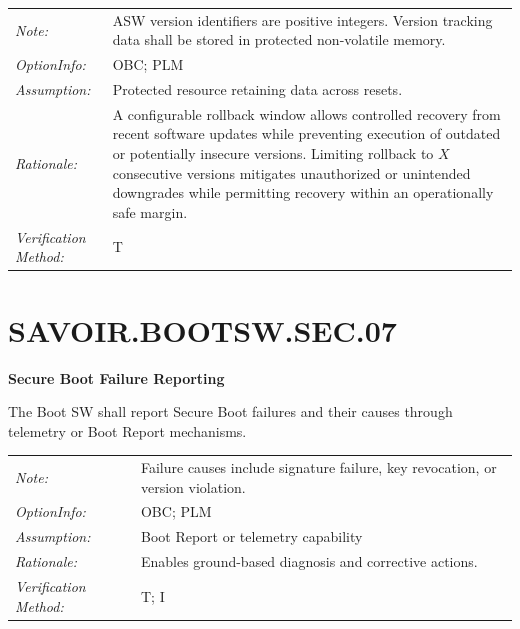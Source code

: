 \begin{tabularx}{\textwidth}{@{}lX@{}}
\textit{Note:} & ASW version identifiers are positive integers. Version tracking data shall be stored in protected non-volatile memory. \\[6pt]
\textit{OptionInfo:} & OBC; PLM \\[6pt]
\textit{Assumption:} & Protected resource retaining data across resets. \\[6pt]
\textit{Rationale:} & A configurable rollback window allows controlled recovery from recent software updates while preventing execution of outdated or potentially insecure versions. Limiting rollback to $X$ consecutive versions mitigates unauthorized or unintended downgrades while permitting recovery within an operationally safe margin. \\[6pt]
\textit{Verification Method:} & T \\[6pt]
\end{tabularx}

\headrule

\section*{SAVOIR.BOOTSW.SEC.07}

\textbf{Secure Boot Failure Reporting}

The Boot SW shall report Secure Boot failures and their causes through telemetry or Boot Report mechanisms.

\vspace{6pt}

\begin{tabularx}{\textwidth}{@{}lX@{}}
\textit{Note:} & Failure causes include signature failure, key revocation, or version violation. \\[6pt]
\textit{OptionInfo:} & OBC; PLM \\[6pt]
\textit{Assumption:} & Boot Report or telemetry capability \\[6pt]
\textit{Rationale:} & Enables ground-based diagnosis and corrective actions. \\[6pt]
\textit{Verification Method:} & T; I \\[6pt]
\end{tabularx}

\headrule
